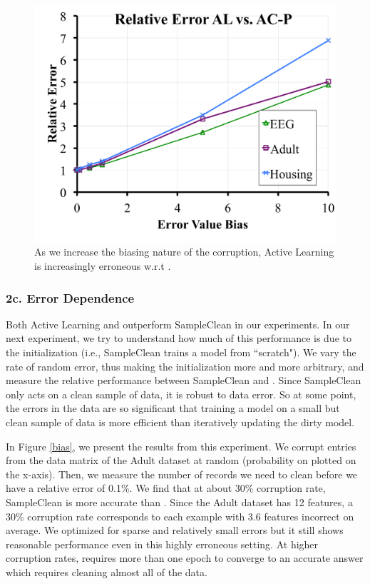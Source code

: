 \begin{figure}[ht!]
\centering
 \includegraphics[width=0.6\columnwidth]{exp/exp10.pdf}
 \caption{As we increase the biasing nature of the corruption, Active Learning is increasingly erroneous w.r.t \sys. \label{albias}}
\end{figure}

\subsubsection{2c. Error Dependence}
Both Active Learning and \sys outperform SampleClean in our experiments.
In our next experiment, we try to understand how much of this performance 
is due to the initialization (i.e., SampleClean trains a model from ``scratch").
We vary the rate of random error, thus making the initialization more and more arbitrary, 
and measure the relative performance between SampleClean and \sys.
Since SampleClean only acts on a clean sample of data, it is robust to data error.
So at some point, the errors in the data are so significant that training a model on a small but clean sample of data is more efficient than iteratively updating the dirty model.

In Figure \ref{bias}, we present the results from this experiment.
We corrupt entries from the data matrix of the Adult dataset at random (probability on plotted on the x-axis).
Then, we measure the number of records we need to clean before we have a relative error of 0.1\%.
We find that at about 30\% corruption rate, SampleClean is more accurate than \sys.
Since the Adult dataset has 12 features, a 30\% corruption rate corresponds to each example with 3.6 features incorrect on average.
We optimized \sys for sparse and relatively small errors but it still shows reasonable performance even in this highly erroneous setting. 
At higher corruption rates, \sys requires more than one epoch to converge to an accurate answer which requires cleaning almost all of the data.

